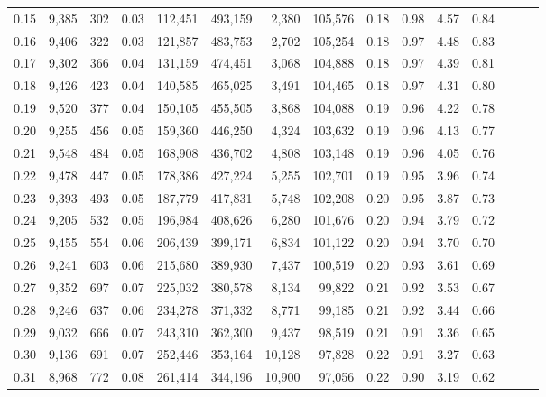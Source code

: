 \begin{tabular}{rrrrrrrrrrrrrrr}
0.15 &  9,385 &    302 &  0.03 &  112,451 &  493,159 &    2,380 &  105,576 &  0.18 &  0.98 &  4.57 &      0.84 \\
0.16 &  9,406 &    322 &  0.03 &  121,857 &  483,753 &    2,702 &  105,254 &  0.18 &  0.97 &  4.48 &      0.83 \\
0.17 &  9,302 &    366 &  0.04 &  131,159 &  474,451 &    3,068 &  104,888 &  0.18 &  0.97 &  4.39 &      0.81 \\
0.18 &  9,426 &    423 &  0.04 &  140,585 &  465,025 &    3,491 &  104,465 &  0.18 &  0.97 &  4.31 &      0.80 \\
0.19 &  9,520 &    377 &  0.04 &  150,105 &  455,505 &    3,868 &  104,088 &  0.19 &  0.96 &  4.22 &      0.78 \\
0.20 &  9,255 &    456 &  0.05 &  159,360 &  446,250 &    4,324 &  103,632 &  0.19 &  0.96 &  4.13 &      0.77 \\
0.21 &  9,548 &    484 &  0.05 &  168,908 &  436,702 &    4,808 &  103,148 &  0.19 &  0.96 &  4.05 &      0.76 \\
0.22 &  9,478 &    447 &  0.05 &  178,386 &  427,224 &    5,255 &  102,701 &  0.19 &  0.95 &  3.96 &      0.74 \\
0.23 &  9,393 &    493 &  0.05 &  187,779 &  417,831 &    5,748 &  102,208 &  0.20 &  0.95 &  3.87 &      0.73 \\
0.24 &  9,205 &    532 &  0.05 &  196,984 &  408,626 &    6,280 &  101,676 &  0.20 &  0.94 &  3.79 &      0.72 \\
0.25 &  9,455 &    554 &  0.06 &  206,439 &  399,171 &    6,834 &  101,122 &  0.20 &  0.94 &  3.70 &      0.70 \\
0.26 &  9,241 &    603 &  0.06 &  215,680 &  389,930 &    7,437 &  100,519 &  0.20 &  0.93 &  3.61 &      0.69 \\
0.27 &  9,352 &    697 &  0.07 &  225,032 &  380,578 &    8,134 &   99,822 &  0.21 &  0.92 &  3.53 &      0.67 \\
0.28 &  9,246 &    637 &  0.06 &  234,278 &  371,332 &    8,771 &   99,185 &  0.21 &  0.92 &  3.44 &      0.66 \\
0.29 &  9,032 &    666 &  0.07 &  243,310 &  362,300 &    9,437 &   98,519 &  0.21 &  0.91 &  3.36 &      0.65 \\
0.30 &  9,136 &    691 &  0.07 &  252,446 &  353,164 &   10,128 &   97,828 &  0.22 &  0.91 &  3.27 &      0.63 \\
0.31 &  8,968 &    772 &  0.08 &  261,414 &  344,196 &   10,900 &   97,056 &  0.22 &  0.90 &  3.19 &      0.62 \\

\end{tabular}

